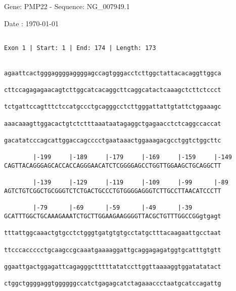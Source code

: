 \documentclass{article}
\begin{document}
\begin{center}
\begin{large}
 Gene: PMP22 - Sequence: NG\_007949.1
 
 Date : \today
\end{large}
\end{center}
 \begin{Verbatim}
 
Exon 1 | Start: 1 | End: 174 | Length: 173


agaattcactgggaggggaggggagccagtgggacctcttggctattacacaggttggca
                                                            
cttccagagagaacagtcttggcatcacaggcttcaggcatactcaaagctcttctccct
                                                            
tctgattccagtttctccatgccctgcagggcctcttgggattattgtattctggaaagc
                                                            
aaacaaagttggacactgtctctttaaataatagaggctgagaacctctcaggccaccat
                                                            
gacatatcccagcattggaccagcccctgaataaactggaaagacgcctggtctggcttc
                                                            
        |-199     |-189     |-179     |-169     |-159     |-149
CAGTTACAGGGAGCACCACCAGGGAACATCTCGGGGAGCCTGGTTGGAAGCTGCAGGCTT
                                                            
        |-139     |-129     |-119     |-109     |-99      |-89
AGTCTGTCGGCTGCGGGTCTCTGACTGCCCTGTGGGGAGGGTCTTGCCTTAACATCCCTT
                                                            
        |-79      |-69      |-59      |-49      |-39        
GCATTTGGCTGCAAAGAAATCTGCTTGGAAGAAGGGGTTACGCTGTTTGGCCGGgtgagt
                                                            
tttattggcaaactgtgcctctgggtgatgtgtgcctatgctttacaagaattgcctaat
                                                            
ttcccaccccctgcaagccgcaaatgaaaaggattgcaggagagatggtgcatttgtgtt
                                                            
ggaattgactggagattcagagggctttttatatccttggttaaaaggtggatatatact
                                                            
ctggctggggaggtggggggccatctgagagcatctagaaaccctaatgcatccagattg
                                                            

\end{Verbatim}
\end{document}
